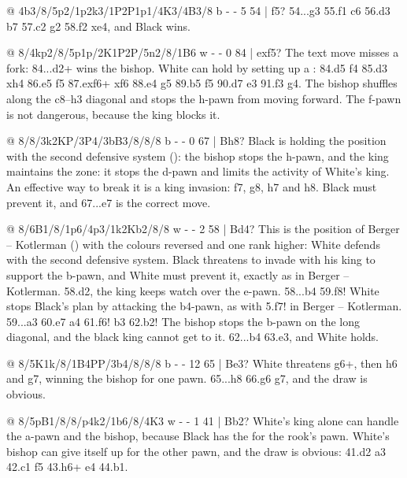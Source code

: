 @ 4b3/8/5p2/1p2k3/1P2P1p1/4K3/4B3/8 b - - 5 54 | f5?
54...g3 55.\B f1 \B c6 56.\B d3 \B b7 57.\B c2 g2 58.\K f2 \B xe4, and Black wins.

@ 8/4kp2/8/5p1p/2K1P2P/5n2/8/1B6 w - - 0 84 | exf5?
The text move misses a fork: 84...\N d2+ wins the bishop. White can hold by
setting up a : 84.\K d5 f4 85.\B d3 \N xh4 86.e5 f5 87.exf6+ \K xf6
88.\K e4 \K g5 89.\B b5 \N f5 90.\B d7 \N e3 91.\K f3 \N g4. The bishop shuffles along the c8--h3
diagonal and stops the h-pawn from moving forward. The f-pawn is not dangerous, because the king
blocks it.

@ 8/8/3k2KP/3P4/3bB3/8/8/8 b - - 0 67 | Bh8?
Black is holding the position with the second defensive system
():
the bishop stops the h-pawn, and the king maintains the zone: it stops the d-pawn and limits the
activity of White's king. An effective way to break it is a king invasion: \K f7, \K g8, h7 and h8. Black must
prevent it, and 67...\K e7 is the correct move.

@ 8/6B1/8/1p6/4p3/1k2Kb2/8/8 w - - 2 58 | Bd4?
This is the position of Berger -- Kotlerman () with the colours
reversed and one rank higher: White defends with the second defensive
system. Black threatens to invade with his
king to support the b-pawn, and White must prevent it, exactly as in Berger -- Kotlerman.
58.\K d2, the king keeps watch over the e-pawn.
58...b4 59.\B f8! White stops Black's plan by attacking the b4-pawn, as with 5.\B f7! in Berger --
Kotlerman. 59...\K a3 60.\B e7 \K a4 61.\B f6! b3 62.\B b2! The bishop stops the b-pawn on the long
diagonal, and the black king cannot get to it. 62...\K b4 63.\K e3, and White holds.

@ 8/5K1k/8/1B4PP/3b4/8/8/8 b - - 12 65 | Be3?
White threatens g6+, then h6 and g7, winning the bishop for one pawn. 65...\K h8 66.g6 \B g7, and the
draw is obvious.

@ 8/5pB1/8/8/p4k2/1b6/8/4K3 w - - 1 41 | Bb2?
White's king alone can handle the a-pawn and the bishop, because Black has the
 for the rook's pawn.
White's bishop can give itself up for the other pawn, and the
draw is obvious: 41.\K d2 a3 42.\K c1 f5 43.\B h6+ \K e4 44.\K b1.

